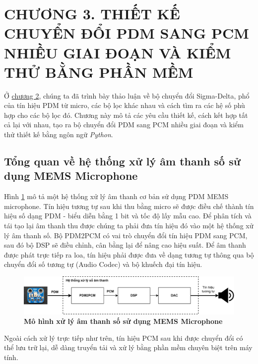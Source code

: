 \section*{CHƯƠNG 3. THIẾT KẾ CHUYỂN ĐỔI PDM SANG PCM NHIỀU GIAI ĐOẠN VÀ KIỂM THỬ BẰNG PHẦN MỀM} \label{chuong3}
\setcounter{section}{3}
\setcounter{subsection}{0}
\setcounter{figure}{0}
\setcounter{table}{0}
Ở \hyperref[chuong2]{chương 2}, chúng ta đã trình bày thảo luận về bộ chuyển đổi Sigma-Delta, phổ của tín hiệu PDM từ micro, các bộ lọc khác nhau và cách tìm ra các hệ số phù hợp cho các bộ lọc đó. Chương này mô tả các yêu cầu thiết kế, cách kết hợp tất cả lại với nhau, tạo ra bộ chuyển đổi PDM sang PCM nhiều giai đoạn và kiểm thử thiết kế bằng ngôn ngữ \textit{Python}.
\subsection{Tổng quan về hệ thống xử lý âm thanh số sử dụng MEMS Microphone}
Hình \ref{audio_top} mô tả một hệ thống xử lý âm thanh cơ bản sử dụng PDM MEMS microphone. Tín hiệu tương tự sau khi thu bằng micro sẽ được điều chế thành tín hiệu số dạng PDM - biểu diễn bằng 1 bit và tốc độ lấy mẫu cao. Để phân tích và tái tạo lại âm thanh thu được chúng ta phải đưa tín hiệu đó vào một hệ thống xử lý âm thanh số. Bộ PDM2PCM có vai trò chuyển đổi tín hiệu PDM sang PCM, sau đó bộ DSP sẽ điều chỉnh, cân bằng lại để nâng cao hiệu suất. Để âm thanh được phát trực tiếp ra loa, tín hiệu phải được đưa về dạng tương tự thông qua bộ chuyển đổi số tương tự (Audio Codec) và bộ khuếch đại tín hiệu.
\begin{figure}[H]
    \centering
    \includegraphics[width=14cm]{Images/Chuong3/MoDau/audio_top.png}
    \caption[Sơ đồ tổng quát của bộ chuyển đổi]{\bfseries \fontsize{12pt}{0pt}\selectfont Mô hình xử lý âm thanh số sử dụng MEMS Microphone}
    \label{audio_top}
\end{figure}

Ngoài cách xử lý trực tiếp như trên, tín hiệu PCM sau khi được chuyển đổi có thể lưu trữ lại, dễ dàng truyển tải và xử lý bằng phần mềm chuyên biệt trên máy tính.


